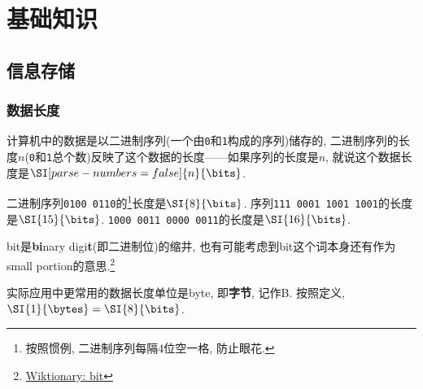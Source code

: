 \documentclass{ctexart}
\def\binaryseq#1{{\texttt{#1}}}
\begin{document}

\section{基础知识} %
\label{sec:基础知识}

\subsection{信息存储} %
\label{sub:信息存储}

\subsubsection{数据长度} %
\label{ssub:数据长度}

计算机中的数据是以二进制序列(一个由\binaryseq{0}和\binaryseq{1}构成的序列)储存的, 二进制序列的长度$n$(\binaryseq{0}和\binaryseq{1}总个数)反映了这个数据的长度——如果序列的长度是$n$, 就说这个数据长度是$\SI[parse-numbers=false]{n}{\bits}$.
\begin{sample}
    \begin{ex}
        \label{ex:二进制序列的bits数}
        二进制序列\binaryseq{0100 0110}的\footnote{按照惯例, 二进制序列每隔$4$位空一格, 防止眼花.}长度是$\SI{8}{\bits}$. 序列\binaryseq{111 0001 1001 1001}的长度是$\SI{15}{\bits}$. \binaryseq{1000 0011 0000 0011}的长度是$\SI{16}{\bits}$.
    \end{ex}
\end{sample}
\begin{remark}
    bit是\textbf{bi}nary digi\textbf{t}(即二进制位)的缩并, 也有可能考虑到bit这个词本身还有作为small portion的意思.\footnote{\href{https://en.wiktionary.org/wiki/bit\#Etymology_3}{Wiktionary: bit}}
\end{remark}
实际应用中更常用的数据长度单位是byte, 即\textbf{字节}, 记作B. 按照定义, $\SI{1}{\bytes} = \SI{8}{\bits}$.
\def\cellunderbrace{\raisebox{.5\normalbaselineskip}[0pt][0pt]{$\underbrace{\phantom{abcdefghij}\hspace*{14\tabcolsep}}$}}
\end{document}
